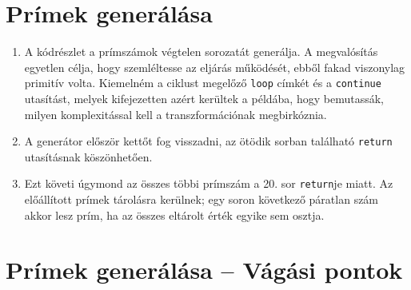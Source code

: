 \documentclass[12pt, a4paper]{article}
\begin{document}
\section{Prímek generálása}

\begin{enumerate}
    \item
    A kódrészlet a prímszámok végtelen sorozatát generálja. A megvalósítás egyetlen célja, hogy szemléltesse az eljárás működését, ebből fakad viszonylag primitív volta. Kiemelném a ciklust megelőző \texttt{loop} címkét és a \texttt{continue} utasítást, melyek kifejezetten azért kerültek a példába, hogy bemutassák, milyen komplexitással kell a transzformációnak megbirkóznia.
    \item
    A generátor először kettőt fog visszadni, az ötödik sorban található \texttt{return} utasításnak köszönhetően.
    \item
    Ezt követi úgymond az összes többi prímszám a 20. sor \texttt{return}je miatt.  Az előállított prímek tárolásra kerülnek; egy soron következő páratlan szám akkor lesz prím, ha az összes eltárolt érték egyike sem osztja.
\end{enumerate}

\section{Prímek generálása -- Vágási pontok}
\end{document}
